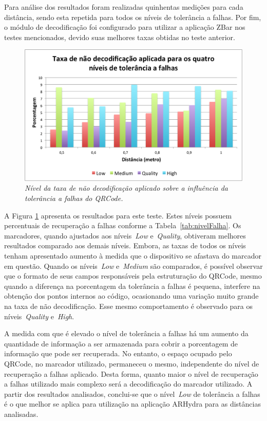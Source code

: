 	Para análise dos resultados foram realizadas quinhentas medições para cada distância, sendo esta 
	repetida para todos os níveis de tolerância a falhas. Por fim, o módulo de decodificação foi configurado 
	para utilizar a	aplicação ZBar nos testes mencionados, devido suas melhores taxas obtidas no teste anterior. 
	
	\begin{figure}[htb]
		\centering \includegraphics[scale=0.75]{figuras/cap4/grafico_nivel_decode.png}
		\caption{\textit{Nível da taxa de não decodificação aplicado sobre a influ{\^e}ncia da toler{\^a}ncia a falhas do QRCode.}}
		\label{fig:testeNivelDecode} 
	\end{figure}
	
	A Figura \ref{fig:testeNivelDecode} apresenta os resultados para este teste. Estes níveis possuem percentuais de 
	recuperação a falhas conforme a Tabela~\ref{tab:nivelFalha}. Os marcadores, quando ajustados aos 
	níveis~\textit{Low} e~\textit{Quality}, obtiveram melhores resultados comparado aos demais níveis. Embora, as taxas 
	de todos os níveis tenham apresentado aumento à medida que o dispositivo se afastava do marcador em questão. Quando 
	os níveis~\textit{Low} e~\textit{Medium} são comparados, é possível observar que o formato de seus campos responsáveis
	pela estruturação do QRCode, mesmo quando a diferença na porcentagem da tolerância a falhas é pequena, interfere na 
	obtenção dos pontos	internos ao código, ocasionando uma variação muito grande na taxa de não decodificação. 
	Esse mesmo comportamento é observado para os níveis~\textit{Quality} e~\textit{High}. 
	
	A medida com que é elevado o nível de tolerância a falhas há um aumento da quantidade de informação a ser armazenada
	para cobrir a porcentagem de informação que pode ser recuperada. No entanto, o espaço ocupado pelo QRCode, no marcador 
	utilizado, permaneceu o mesmo, independente do nível de recuperação a falhas aplicado. Desta forma, quanto maior o nível de 
	recuperação a falhas utilizado mais complexo será a decodificação do marcador utilizado. A partir dos resultados 
	analisados, conclui-se que o nível~\textit{Low} de tolerância a falhas é o que melhor se aplica para utilização na 
	aplicação ARHydra para as distâncias analisadas. 
	
	
	